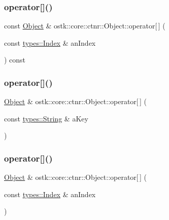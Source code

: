 \subsubsection{\texorpdfstring{operator[]()}{operator[]()}\hspace{0.1cm}{\footnotesize\ttfamily [2/4]}}
{\footnotesize\ttfamily const \hyperlink{classostk_1_1core_1_1ctnr_1_1_object}{Object} \& ostk\+::core\+::ctnr\+::\+Object\+::operator\mbox{[}$\,$\mbox{]} (\begin{DoxyParamCaption}\item[{const \hyperlink{namespaceostk_1_1core_1_1types_a6e63c1b15b2e5bc87a43771c09fa913a}{types\+::\+Index} \&}]{an\+Index }\end{DoxyParamCaption}) const}

\mbox{\label{classostk_1_1core_1_1ctnr_1_1_object_a707694d7adcfbfc6182a1d5b978943b2}} 
\subsubsection{\texorpdfstring{operator[]()}{operator[]()}\hspace{0.1cm}{\footnotesize\ttfamily [3/4]}}
{\footnotesize\ttfamily \hyperlink{classostk_1_1core_1_1ctnr_1_1_object}{Object} \& ostk\+::core\+::ctnr\+::\+Object\+::operator\mbox{[}$\,$\mbox{]} (\begin{DoxyParamCaption}\item[{const \hyperlink{classostk_1_1core_1_1types_1_1_string}{types\+::\+String} \&}]{a\+Key }\end{DoxyParamCaption})}

\mbox{\label{classostk_1_1core_1_1ctnr_1_1_object_acdbdde3562f909e03d63ecf0c0a7b0c0}} 
\subsubsection{\texorpdfstring{operator[]()}{operator[]()}\hspace{0.1cm}{\footnotesize\ttfamily [4/4]}}
{\footnotesize\ttfamily \hyperlink{classostk_1_1core_1_1ctnr_1_1_object}{Object} \& ostk\+::core\+::ctnr\+::\+Object\+::operator\mbox{[}$\,$\mbox{]} (\begin{DoxyParamCaption}\item[{const \hyperlink{namespaceostk_1_1core_1_1types_a6e63c1b15b2e5bc87a43771c09fa913a}{types\+::\+Index} \&}]{an\+Index }\end{DoxyParamCaption})}

